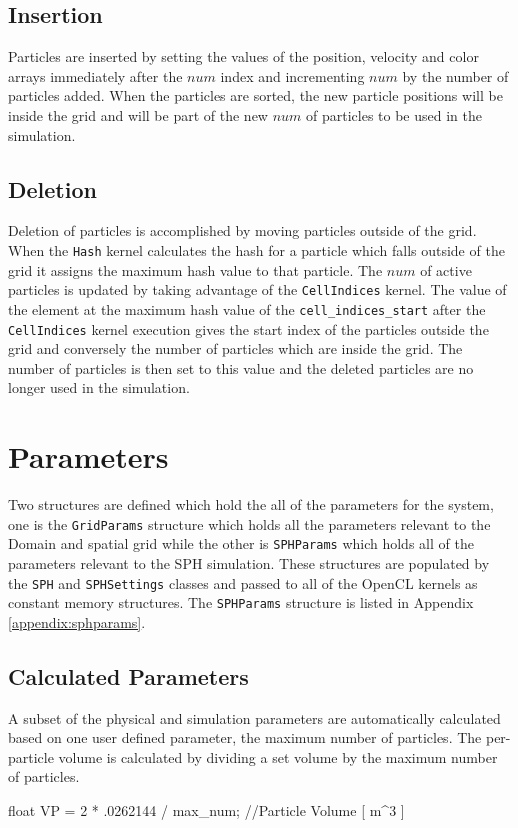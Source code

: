 \subsection{Insertion}
Particles are inserted by setting the values of the position, velocity and
color arrays immediately after the $num$ index and incrementing $num$ by the
number of particles added. When the particles are sorted, the new particle
positions will be inside the grid and will be part of the new $num$ of
particles to be used in the simulation.

\subsection{Deletion}
Deletion of particles is accomplished by moving particles outside of the grid.
When the \verb|Hash| kernel calculates the hash for a particle which falls
outside of the grid it assigns the maximum hash value to that particle.
The $num$ of active particles is updated by taking advantage of the
\verb|CellIndices| kernel. The value of the element at the maximum hash value
of the \verb|cell_indices_start| after the \verb|CellIndices| kernel execution
gives the start index of the particles outside the grid and conversely the
number of particles which are inside the grid. The number of particles is then
set to this value and the deleted particles are no longer used in the
simulation.

\section{Parameters}
Two structures are defined which hold the all of the parameters for the system,
one is the \verb|GridParams| structure which holds all the parameters relevant
to the Domain and spatial grid while the other is \verb|SPHParams| which holds
all of the parameters relevant to the SPH simulation. These structures are
populated by the \verb|SPH| and \verb|SPHSettings| classes and passed to all of
the OpenCL kernels as constant memory structures. The \verb|SPHParams|
structure is listed in Appendix \ref{appendix:sphparams}.


\subsection{Calculated Parameters}
A subset of the physical and simulation parameters are automatically calculated
based on one user defined parameter, the maximum number of particles. The
per-particle volume is calculated by dividing a set volume by the maximum
number of particles. 
\begin{cppcode}{0}
float VP = 2 * .0262144 / max_num;              //Particle Volume [ m^3 ]
\end{cppcode}

